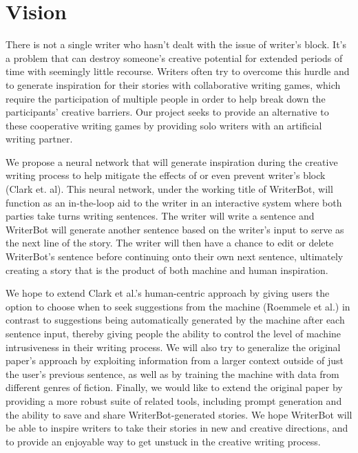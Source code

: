 \section{Vision}\label{sec:vison}
There is not a single writer who hasn’t dealt with the issue of writer's block. It’s a problem that can destroy someone's creative potential for extended periods of time with seemingly little recourse.  Writers often try to overcome this hurdle and to generate inspiration for their stories with collaborative writing games, which require the participation of multiple people in order to help break down the participants’ creative barriers. Our project seeks to provide an alternative to these cooperative writing games by providing solo writers with an artificial writing partner.

We propose a neural network that will generate inspiration during the creative writing process to help mitigate the effects of or even prevent writer's block (Clark et. al). This neural network, under the working title of WriterBot, will function as an in-the-loop aid to the writer in an interactive system where both parties take turns writing sentences. The writer will write a sentence and WriterBot will generate another sentence based on the writer’s input to serve as the next line of the story. The writer will then have a chance to edit or delete WriterBot’s sentence before continuing onto their own next sentence, ultimately creating a story that is the product of both machine and human inspiration.

We hope to extend Clark et al.’s human-centric approach by giving users the option to choose when to seek suggestions from the machine (Roemmele et al.) in contrast to suggestions being automatically generated by the machine after each sentence input, thereby giving people the ability to control the level of machine intrusiveness in their writing process.  We will also try to generalize the original paper’s approach by exploiting information from a larger context outside of just the user’s previous sentence, as well as by training the machine with data from different genres of fiction.  Finally, we would like to extend the original paper by providing a more robust suite of related tools, including prompt generation and the ability to save and share WriterBot-generated stories. We hope WriterBot will be able to inspire writers to take their stories in new and creative directions, and to provide an enjoyable way to get unstuck in the creative writing process.
